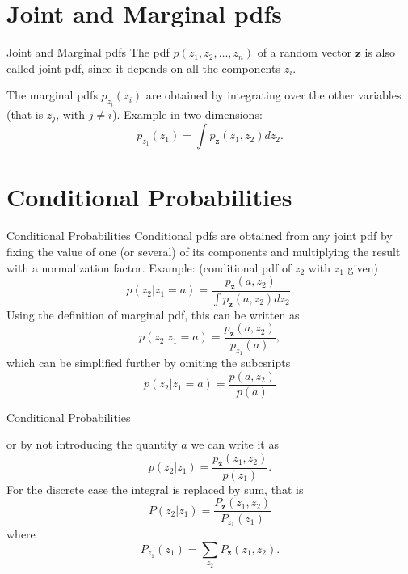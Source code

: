 \documentclass{beamer}
\begin{document}
\section{Joint and Marginal pdfs}

\begin{frame}{Joint and Marginal pdfs}
  The pdf $p(z_1, z_2, \ldots, z_n)$ of a random vector $\mathbf{z}$ is also
  called joint pdf, since it depends on all the components $z_i$.

  The marginal pdfs $p_{z_i}(z_i)$ are obtained by integrating over the other
  variables (that is $z_j$, with $j \ne i$). Example in two dimensions:
  \[ p_{z_1}(z_1) =  \int p_{\mathbf{z}}(z_1, z_2)dz_2.\]

\end{frame}

\section{Conditional Probabilities}

\begin{frame}{Conditional Probabilities}
  Conditional pdfs are obtained from any joint pdf by fixing the value of one (or
  several) of its components and multiplying the result with a normalization
  factor. Example: (conditional pdf of $z_2$ with $z_1$ given)
  \[
  p(z_2|z_1 = a) =
  \frac{ p_{\mathbf{z}}(a, z_2)}{\int p_{\mathbf{z}}(a, z_2)dz_2}.
  \]
  Using the definition of marginal pdf, this can be written as
  \[
  p(z_2|z_1 = a) =
  \frac{ p_{\mathbf{z}}(a, z_2)}{p_{z_1}(a)},
  \]
  which can be simplified further by omiting the subcsripts
  \[
  p(z_2|z_1 = a) =
  \frac{ p(a, z_2)}{p(a)}
  \]
\end{frame}

\begin{frame}{Conditional Probabilities}

  or by not introducing the quantity $a$ we can write it as
  \[
  p(z_2|z_1) =
  \frac{ p_{\mathbf{z}}(z_1, z_2)}{p(z_1)}.
  \]
  For the discrete case the integral is replaced by sum, that is
  \[
  P(z_2|z_1) = \frac{P_{\mathbf{z}}(z_1, z_2)}{P_{z_1}(z_1)}
  \]
  where
  \[
  P_{z_1}(z_1) = \sum_{z_2}P_{\mathbf{z}}(z_1, z_2).
  \]
\end{frame}
\end{document}
